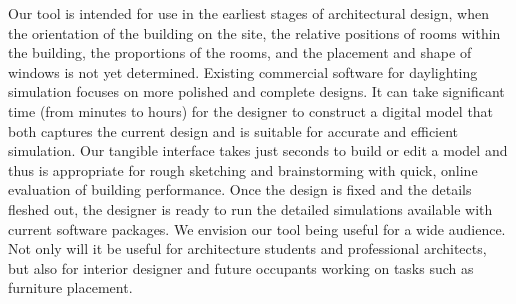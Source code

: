 \documentclass[review]{vgtc}                 %
\begin{document}
Our tool is intended for use in the earliest stages of architectural
design, when the orientation of the building on the site, the relative
positions of rooms within the building, the proportions of the rooms,
and the placement and shape of windows is not yet determined.
Existing commercial software for daylighting simulation focuses on
more polished and complete designs.  It can take significant time
(from minutes to hours) for the designer to construct a digital model
that both captures the current design and is suitable for accurate and
efficient simulation.  Our tangible interface takes just seconds to
build or edit a model and thus is appropriate for rough sketching and
brainstorming with quick, online evaluation of building performance.
Once the design is fixed and the details fleshed out, the designer is
ready to run the detailed simulations available with current software
packages.  We envision our tool being useful for a wide audience.  Not
only will it be useful for architecture students and professional
architects, but also for interior designer and future occupants
working on tasks such as furniture placement.

%
\end{document}
